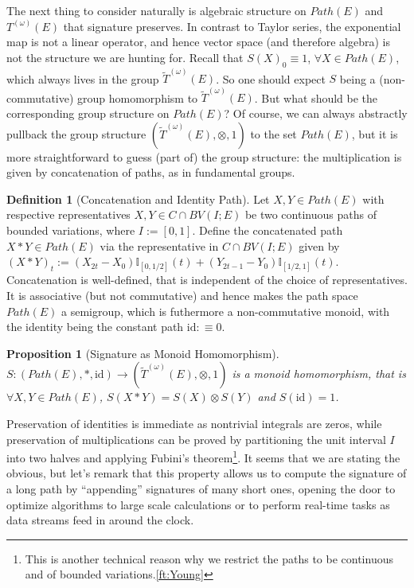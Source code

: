 \documentclass[fleqn]{article}
\newtheorem{prop}[thm]{Proposition}
\theoremstyle{definition}
\newtheorem{defn}[thm]{Definition}
\theoremstyle{remark}
\newcommand{\id}{\mathrm{id}} %
\begin{document}
\par
The next thing to consider naturally is algebraic structure on $Path(E)$ and $T^{(\omega)}(E)$ that signature preserves. In contrast to Taylor series, the exponential map is not a linear operator, and hence vector space (and therefore algebra) is not the structure we are hunting for. Recall that $S(X)_0 \equiv 1$, $\forall X\in Path(E)$, which always lives in the group $\tilde{T}^{(\omega)}(E)$. So one should expect $S$ being a (non-commutative) group homomorphism to $\tilde{T}^{(\omega)}(E)$. But what should be the corresponding group structure on $Path(E)$? Of course, we can always abstractly pullback the group structure $\left(\tilde{T}^{(\omega)}(E), \otimes, 1\right)$ to the set $Path(E)$, but it is more straightforward to guess (part of) the group structure: the multiplication is given by concatenation of paths, as in fundamental groups.
\begin{defn}[Concatenation and Identity Path]
Let $X,Y\in Path(E)$ with respective representatives $X,Y\in C\cap BV(I;E)$ be two continuous paths of bounded variations, where $I:=[0,1]$. Define the concatenated path $X*Y\in Path(E)$ via the representative in $C\cap BV(I;E)$ given by $(X*Y)_t:=(X_{2t}-X_0)\mathbb{I}_{[0,1/2]}(t) + (Y_{2t-1}-Y_0)\mathbb{I}_{[1/2,1]}(t)$. Concatenation is well-defined, that is independent of the choice of representatives. It is associative (but not commutative) and hence makes the path space $Path(E)$ a semigroup, which is futhermore a non-commutative monoid, with the identity being the constant path $\id:\equiv 0$.
\end{defn}

\begin{prop}[Signature as Monoid Homomorphism]
$S:\left(Path(E),*,\id\right) \to \left(\tilde{T}^{(\omega)}(E),\otimes,1\right)$ is a monoid homomorphism, that is $\forall X,Y\in Path(E)$, $S(X*Y)=S(X)\otimes S(Y)$ and $S(\id)=1$.
\end{prop}
Preservation of identities is immediate as nontrivial integrals are zeros, while preservation of multiplications can be proved by partitioning the unit interval $I$ into two halves and applying Fubini's theorem\footnote{This is another technical reason why we restrict the paths to be continuous and of bounded variations.\ref{ft:Young}}. It seems that we are stating the obvious, but let's remark that this property allows us to compute the signature of a long path by ``appending'' signatures of many short ones, opening the door to optimize algorithms to large scale calculations or to perform real-time tasks as data streams feed in around the clock. 
\end{document}
